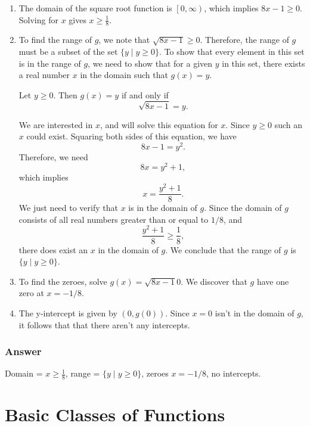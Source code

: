 \documentclass[11pt, letterpaper, oneside]{memoir}
\begin{document}
\begin{enumerate}[label=\roman*]

  \item
    The domain of the square root function is $ \left[ 0, \infty \right) $, which implies $ 8x - 1 \ge 0 $. Solving for $ x $ gives $ x \ge \frac{1}{8} $.

  \item
    To find the range of $ g $, we note that $ \sqrt{8x - 1} \ge 0 $. Therefore, the range of $ g $ must be a subset of the set $ \{y \mid y \ge 0\} $. To show that every element in this set is in the range of $ g $, we need to show that for a given $ y $ in this set, there exists a real number $ x $ in the domain such that $ g(x) = y $.

    Let $ y \ge 0 $. Then $ g(x) = y $ if and only if
    $$ \phantom{.}
    \sqrt{8x - 1} = y
    .$$

    We are interested in $ x $, and will solve this equation for $ x $. Since $ y \ge 0 $ such an $ x $ could exist. Squaring both sides of this equation, we have
    $$ \phantom{.}
    {8x - 1} = y^2
    .$$
    Therefore, we need
    $$ \phantom{.}
    8x = y^2 + 1
    ,$$
    which implies
    $$ \phantom{.}
    x = \frac{y^2 + 1}{8}
    .$$
    We just need to verify that $ x $ is in the domain of $ g $. Since the domain of $ g $ consists of all real numbers greater than or equal to $ 1 / 8 $, and
    $$ \phantom{.}
    \frac{y^2 + 1}{8} \ge \frac{1}{8}
    ,$$
    there does exist an $ x $ in the domain of $ g $. We conclude that the range of $ g $ is $ \{ y \mid y \ge 0 \} $.

  \item
    To find the zeroes, solve $ g(x) = \sqrt{8x - 1}0 $. We discover that $ g $ have one zero at $ x = -1/8 $.

  \item The y-intercept is given by $ (0, g(0)) $. Since $ x = 0 $ isn't in the domain of $ g $, it follows that that there aren't any intercepts.

\end{enumerate}

\subsubsection{Answer}

Domain = $ x \ge \frac{1}{8} $, range = $ \{ y \mid y \ge 0 \} $, zeroes $ x = -1/8 $, no intercepts.









\section{Basic Classes of Functions}


\end{document}
